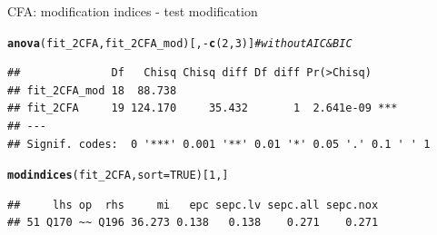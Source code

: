 \documentclass[10pt]{beamer}\usepackage[]{graphicx}\usepackage[]{xcolor}
\makeatletter
\newcommand{\hlnum}[1]{\textcolor[rgb]{0.686,0.059,0.569}{#1}}%
\newcommand{\hlcom}[1]{\textcolor[rgb]{0.678,0.584,0.686}{\textit{#1}}}%
\newcommand{\hlopt}[1]{\textcolor[rgb]{0,0,0}{#1}}%
\newcommand{\hlstd}[1]{\textcolor[rgb]{0.345,0.345,0.345}{#1}}%
\newcommand{\hlkwc}[1]{\textcolor[rgb]{0.333,0.667,0.333}{#1}}%
\newcommand{\hlkwd}[1]{\textcolor[rgb]{0.737,0.353,0.396}{\textbf{#1}}}%
\newenvironment{kframe}{%
 \def\at@end@of@kframe{}%
 \ifinner\ifhmode%
  \def\at@end@of@kframe{\end{minipage}}%
  \begin{minipage}{\columnwidth}%
 \fi\fi%
 \def\FrameCommand##1{\hskip\@totalleftmargin \hskip-\fboxsep
 \colorbox{shadecolor}{##1}\hskip-\fboxsep
     \hskip-\linewidth \hskip-\@totalleftmargin \hskip\columnwidth}%
 \MakeFramed {\advance\hsize-\width
   \@totalleftmargin\z@ \linewidth\hsize
   \@setminipage}}%
 {\par\unskip\endMakeFramed%
 \at@end@of@kframe}
\newenvironment{knitrout}{}{} %
\makeatother
\begin{document}
\begin{frame}[fragile]{CFA: modification indices - test modification}

\begin{knitrout}
\color{fgcolor}\begin{kframe}
\begin{alltt}
\hlkwd{anova}\hlstd{(fit_2CFA, fit_2CFA_mod)[,}\hlopt{-}\hlkwd{c}\hlstd{(}\hlnum{2}\hlstd{,}\hlnum{3}\hlstd{)]} \hlcom{# without AIC & BIC}
\end{alltt}
\begin{verbatim}
##              Df   Chisq Chisq diff Df diff Pr(>Chisq)    
## fit_2CFA_mod 18  88.738                                  
## fit_2CFA     19 124.170     35.432       1  2.641e-09 ***
## ---
## Signif. codes:  0 '***' 0.001 '**' 0.01 '*' 0.05 '.' 0.1 ' ' 1
\end{verbatim}
\end{kframe}
\end{knitrout}

\begin{knitrout}
\color{fgcolor}\begin{kframe}
\begin{alltt}
\hlkwd{modindices}\hlstd{(fit_2CFA,} \hlkwc{sort} \hlstd{=} \hlnum{TRUE}\hlstd{)[}\hlnum{1}\hlstd{,]}
\end{alltt}
\begin{verbatim}
##     lhs op  rhs     mi   epc sepc.lv sepc.all sepc.nox
## 51 Q170 ~~ Q196 36.273 0.138   0.138    0.271    0.271
\end{verbatim}
\end{kframe}
\end{knitrout}

\end{frame}
%
\end{document}
